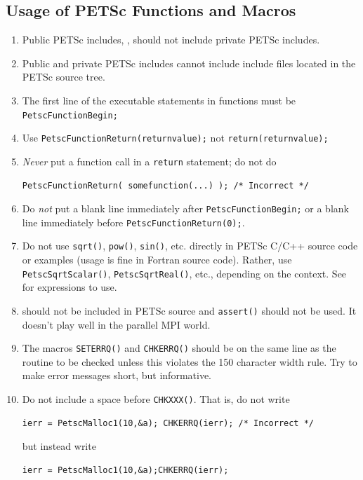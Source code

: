 \subsection{Usage of PETSc Functions and Macros}
\label{sec:stylepetsc}
\begin{enumerate}
\item Public PETSc includes, , should not include private PETSc  includes.
\item Public and private PETSc includes cannot include include files located in the PETSc source tree.
\item The first line of the executable statements in functions must be \lstinline{PetscFunctionBegin;}
\item Use \lstinline{PetscFunctionReturn(returnvalue);} not \lstinline{return(returnvalue);}
\item {\em Never} put a function call in a \lstinline{return} statement; do not do
\begin{lstlisting}
PetscFunctionReturn( somefunction(...) ); /* Incorrect */
\end{lstlisting}
\item Do {\em not} put a blank line immediately after \lstinline{PetscFunctionBegin;} or
  a blank line immediately before \lstinline{PetscFunctionReturn(0);}.
\item Do not use \lstinline{sqrt()}, \lstinline{pow()}, \lstinline{sin()}, etc. directly in PETSc C/C++ source code or examples (usage is fine in Fortran source code). 
  Rather, use \lstinline{PetscSqrtScalar()}, \lstinline{PetscSqrtReal()}, etc., depending on the context. 
  See  for expressions to use.
\item {} should not be included in PETSc source and \lstinline{assert()} should not be used. It doesn't play well in the parallel MPI world.
\item The macros \lstinline{SETERRQ()} and \lstinline{CHKERRQ()} should be on the 
  same line as the routine to be checked unless this violates the
  150 character width rule. Try to make error messages short, but
  informative.
\item Do not include a space before \lstinline{CHKXXX()}. 
  That is, do not write
\begin{lstlisting}
ierr = PetscMalloc1(10,&a); CHKERRQ(ierr); /* Incorrect */
\end{lstlisting}
but instead write
\begin{lstlisting}
ierr = PetscMalloc1(10,&a);CHKERRQ(ierr);

\end{lstlisting}
\end{enumerate}
